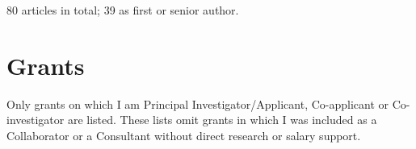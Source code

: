 \documentclass[11pt]{moderncv}
\begin{document}

80 articles in total; 39 as first or senior author.

\begin{refsection}
\nocite{*}

\printbibliography[heading=subbibliography,title=Articles]
\end{refsection}

%
%

\begin{refsection}


\nocite{*}
\printbibliography[heading=subbibliography,title=Book chapters]
\end{refsection}




\begin{refsection}
\nocite{*}
\printbibliography[heading=subbibliography,title=Conference publications]
\end{refsection}




\section{Grants}

Only grants on which I am Principal Investigator/Applicant, Co-applicant or Co-investigator are listed.
These lists omit grants in which I was included as a Collaborator or a Consultant without direct research or salary support.
\end{document}
